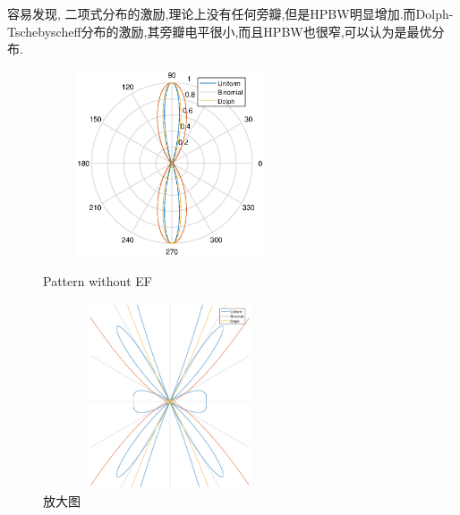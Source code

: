 容易发现, 二项式分布的激励,理论上没有任何旁瓣,但是HPBW明显增加.而Dolph-Tschebyscheff分布的激励,其旁瓣电平很小,而且HPBW也很窄,可以认为是最优分布. 
\begin{figure}[!ht]
	\begin{minipage}[t]{0.35\linewidth}
		\centering
		\includegraphics[height=5.5cm,width=7.5cm]{TenEle_without_EF.eps}
		\caption{Pattern without EF}\label{fig:10elenoEF}
	\end{minipage}%
	\hfill
	\begin{minipage}[t]{0.5\linewidth}
		\centering
		\includegraphics[height=5.5cm,width=7.5cm]{TenEle_without_EF_fangda.eps}
		\caption{放大图}\label{fig:10elenoEF_fangda}
		
	\end{minipage}
\end{figure}


